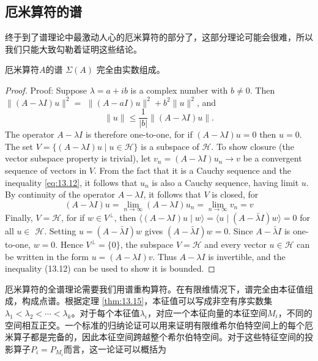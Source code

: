 \subsection{厄米算符的谱}
终于到了谱理论中最激动人心的厄米算符的部分了，这部分理论可能会很难，所以我们只能大致勾勒着证明这些结论。
\begin{theorem}
    厄米算符\( A \)的谱 \(\Sigma(A)\) 完全由实数组成。
\end{theorem}
\begin{proof}
Proof: Suppose \(\lambda=a+i b\) is a complex number with \(b \neq 0\). Then \(\|(A-\lambda I) u\|^{2}=\) \(\|(A-a I) u\|^{2}+b^{2}\|u\|^{2}\), and
\begin{equation}\label{eq:13.12}
    \|u\| \leq \frac{1}{|b|}\|(A-\lambda I) u\| .
\end{equation}
The operator \(A-\lambda I\) is therefore one-to-one, for if \((A-\lambda I) u=0\) then \(u=0\).
The set \(V=\{(A-\lambda I) u \mid u \in \mathcal{H}\}\) is a subspace of \(\mathcal{H}\). To show closure (the vector subspace property is trivial), let \(v_{n}=(A-\lambda I) u_{n} \rightarrow v\) be a convergent sequence of vectors in \(V\). From the fact that it is a Cauchy sequence and the inequality \ref{eq:13.12}, it follows that \(u_{n}\) is also a Cauchy sequence, having limit \(u\). By continuity of the operator \(A-\lambda I\), it follows that \(V\) is closed, for
\[
(A-\lambda I) u=\lim _{n \rightarrow \infty}(A-\lambda I) u_{n}=\lim _{n \rightarrow \infty} v_{n}=v
\]
Finally, \(V=\mathcal{H}\), for if \(w \in V^{\perp}\), then \(\langle(A-\lambda I) u \mid w\rangle=\langle u \mid(A-\bar{\lambda} I) w\rangle=0\) for all \(u \in\) \(\mathcal{H}\). Setting \(u=(A-\bar{\lambda} I) w\) gives \((A-\bar{\lambda} I) w=0\). Since \(A-\bar{\lambda} I\) is one-to-one, \(w=0\). Hence \(V^{\perp}=\{0\}\), the subspace \(V=\mathcal{H}\) and every vector \(u \in \mathcal{H}\) can be written in the form \(u=(A-\lambda I) v\). Thus \(A-\lambda I\) is invertible, and the inequality (13.12) can be used to show it is bounded.
\end{proof}
厄米算符的全谱理论需要我们用谱重构算符。在有限维情况下，谱完全由本征值组成，构成点谱。根据定理 \ref{thm:13.15}，本征值可以写成非空有序实数集 \(\lambda_{1}<\lambda_{2}<\cdots<\lambda_{k}\)。对于每个本征值\(\lambda_{i}\)，对应一个本征向量的本征空间\(M_{i}\)，不同的空间相互正交。一个标准的归纳论证可以用来证明有限维希尔伯特空间上的每个厄米算子都是完备的，因此本征空间跨越整个希尔伯特空间。对于这些特征空间的投影算子\(P_{i}=P_{M_{i}}\)而言，这一论证可以概括为
